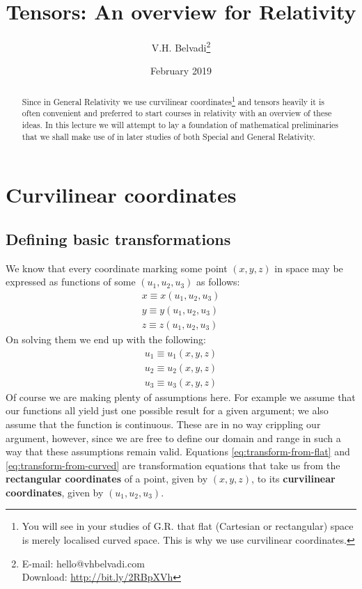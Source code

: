 \documentclass{tufte-handout}
\title[Tensors]{Tensors: An overview for Relativity}
\author{V.H. Belvadi\thanks{E-mail: hello@vhbelvadi.com\\\noindent\hspace{0.25em} Download: \url{http://bit.ly/2RBpXVh}}}
\date{February 2019}
\begin{document}
\maketitle

\begin{abstract}
	Since in General Relativity we use curvilinear coordinates\footnote{You will see in your studies of G.R. that flat (Cartesian or rectangular) space is merely localised curved space. This is why we use curvilinear coordinates.} and tensors heavily it is often convenient and preferred to start courses in relativity with an overview of these ideas. In this lecture we will attempt to lay a foundation of mathematical preliminaries that we shall make use of in later studies of both Special and General Relativity.
\end{abstract}

\section{Curvilinear coordinates}
\subsection{Defining basic transformations}

We know that every coordinate marking some point $(x,y,z)$ in space may be expressed as functions of some $(u_1,u_2,u_3)$ as follows:
\begin{equation}
	\begin{aligned}
		x \equiv x(u_1,u_2,u_3) \\
		y \equiv y(u_1,u_2,u_3) \\
		z \equiv z(u_1,u_2,u_3)
	\end{aligned}
	\label{eq:transform-from-flat}
\end{equation}
On solving them we end up with the following:
\begin{equation}
	\begin{aligned}
		u_1 \equiv u_1(x,y,z) \\
		u_2 \equiv u_2(x,y,z) \\
		u_3 \equiv u_3(x,y,z)
	\end{aligned}
	\label{eq:transform-from-curved}
\end{equation}
Of course we are making plenty of assumptions here. For example we assume that our functions all yield just one possible result for a given argument; we also assume that the function is continuous. These are in no way crippling our argument, however, since we are free to define our domain and range in such a way that these assumptions remain valid. Equations \eqref{eq:transform-from-flat} and \eqref{eq:transform-from-curved} are transformation equations that take us from the \textbf{rectangular coordinates} of a point, given by $(x,y,z)$, to its \textbf{curvilinear coordinates}, given by $(u_1,u_2,u_3)$.
\end{document}
